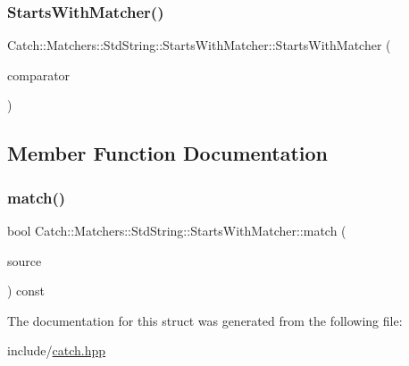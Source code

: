 \subsubsection{\texorpdfstring{Starts\+With\+Matcher()}{StartsWithMatcher()}}
{\footnotesize\ttfamily Catch\+::\+Matchers\+::\+Std\+String\+::\+Starts\+With\+Matcher\+::\+Starts\+With\+Matcher (\begin{DoxyParamCaption}\item[{\mbox{\hyperlink{structCatch_1_1Matchers_1_1StdString_1_1CasedString}{Cased\+String}} const \&}]{comparator }\end{DoxyParamCaption})}



\subsection{Member Function Documentation}
\mbox{\label{structCatch_1_1Matchers_1_1StdString_1_1StartsWithMatcher_a7da4747aed0c48989d8be59a89e2b7fb}} 
\subsubsection{\texorpdfstring{match()}{match()}}
{\footnotesize\ttfamily bool Catch\+::\+Matchers\+::\+Std\+String\+::\+Starts\+With\+Matcher\+::match (\begin{DoxyParamCaption}\item[{std\+::string const \&}]{source }\end{DoxyParamCaption}) const\hspace{0.3cm}{\ttfamily [override]}}



The documentation for this struct was generated from the following file\+:\begin{DoxyCompactItemize}
\item 
include/\mbox{\hyperlink{catch_8hpp}{catch.\+hpp}}\end{DoxyCompactItemize}

